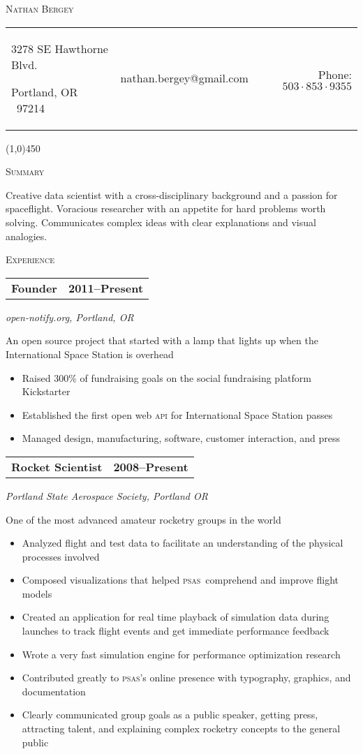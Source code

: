 \documentclass[letterpaper,10pt]{article}
\makeatletter
\newcommand{\me}      {Nathan Bergey}
\newcommand{\email}   {nathan.bergey@gmail.com}
\newcommand{\address} {\begin{minipage}{2in}\raggedright3278 SE Hawthorne Blvd.\par Portland, OR \ 97214\end{minipage}}
\newcommand{\phone}   {$503\cdot853\cdot9355$}
\newcommand{\PSAS}{\textsc{psas}}
\newcommand{\resumepageheader}{
  \begin{center}
    {\LARGE{\textsc{\me}}}

    \vspace{0.2in}

    \begin{tabular*}{6.5in}{l c@{\extracolsep{\fill}} r}
      \address & \email & Phone: \phone \\
    \end{tabular*}
    
    \vspace{0.02in}

    \line(1,0){450}
  \end{center}
}
\newcommand{\resumestatement}[1]{
  \vspace{0.05in}
  \textsc{\Large Summary}
  \vspace{0.1in}
  \begin{center}
    \begin{minipage}{5.5in}
      \small
      #1
    \end{minipage}
  \end{center}
}
\newcommand{\resumeheader}[1]{
  \vspace{0.08in}
  \textsc{\Large #1}
  \vspace{0.10in}
}
\newcommand{\resumeitem}[4]{
  {\addtolength{\leftskip}{0.21in}
    \begin{tabular*}{6.25in}{l@{\extracolsep{\fill}} r}
      {\textbf{#1}} & {\textbf{#2}} \\
    \end{tabular*}
    
  }
  
  \vspace{0.01in}
  {\addtolength{\leftskip}{0.3in}
    \textit{#3}\par
  }
  
  \vspace{0.07in}
  {\addtolength{\leftskip}{0.3in}
    \small
    \begin{minipage}{5in}
      #4
    \end{minipage}
    
  }
  \vspace{0.15in}
}
\makeatother
\begin{document}
\resumepageheader

\resumestatement{
                  Creative data scientist with a cross-disciplinary background 
                  and a passion for spaceflight. Voracious researcher with an 
                  appetite for hard problems worth solving. Communicates complex 
                  ideas with clear explanations and visual analogies.
                }


\resumeheader{Experience} 

\resumeitem{Founder}{2011--Present}%
           {open-notify.org, Portland, OR}%
           {
              An open source project that started with a lamp that lights up when the 
              International Space Station is overhead
              \begin{itemize}[topsep=1pt, itemsep=0pt, parsep=0pt]
                \renewcommand{\labelitemi}{---}
                \item Raised 300\% of fundraising goals on the social fundraising platform Kickstarter
                \item Established the first open web \textsc{api} for International Space Station passes
                \item Managed design, manufacturing, software, customer interaction, and press
              \end{itemize}
           }

\resumeitem{Rocket Scientist}{2008--Present}%
           {Portland State Aerospace Society, Portland OR}%
           {
              One of the most advanced amateur rocketry groups in the world
              \begin{itemize}[topsep=1pt, itemsep=0pt, parsep=0pt]
                \renewcommand{\labelitemi}{---}
                \item Analyzed flight and test data to facilitate an understanding of the physical processes involved
                \item Composed visualizations that helped \PSAS\ comprehend and improve flight models
                \item Created an application for real time playback of simulation data during launches to track flight events and get immediate performance feedback
                \item Wrote a very fast simulation engine for performance optimization research
                \item Contributed greatly to \PSAS's online presence with typography, graphics, and documentation
                \item Clearly communicated group goals as a public speaker, getting press, attracting talent, and explaining complex rocketry concepts to the general public
              \end{itemize}
           }
           
\end{document}
